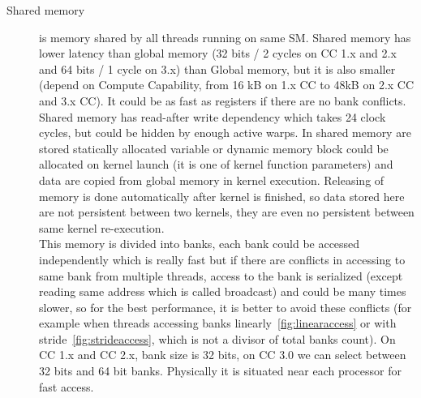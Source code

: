 \begin{description}
\item[Shared memory] is memory shared by all threads running on same SM. Shared memory has lower latency than global memory (32 bits / 2 cycles on CC 1.x and 2.x and 64 bits / 1 cycle on 3.x) than Global memory, but it is also smaller (depend on Compute Capability, from 16 kB on 1.x CC to 48kB on 2.x CC and 3.x CC). It could be as fast as registers if there are no bank conflicts. Shared memory has read-after write dependency which takes 24 clock cycles, but could be hidden by enough active warps. In shared memory are stored statically allocated variable or dynamic memory block could be allocated on kernel launch (it is one of kernel function parameters) and data are copied from global memory in kernel execution. Releasing of memory is done automatically after kernel is finished, so data stored here are not persistent between two kernels, they are even no persistent between same kernel re-execution.\\
This memory is divided into banks, each bank could be accessed independently which is really fast but if there are conflicts in accessing to same bank from multiple threads, access to the bank is serialized (except reading same address which is called broadcast) and could be many times slower, so for the best performance, it is better to avoid these conflicts (for example when threads accessing banks linearly~\ref{fig:linearaccess} or with stride~\ref{fig:strideaccess}, which is not a divisor of total banks count). On CC 1.x and CC 2.x, bank size is 32 bits, on CC 3.0 we can select between 32 bits and 64 bit banks. Physically it is situated near each processor for fast access.\\
\end{description}

